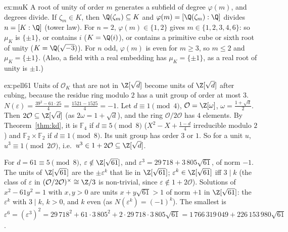 \begin{solution}{ex:muK}
\idea A root of unity of order $m$ generates a subfield of degree $\varphi(m)$, and degrees divide.
\writeup If $\zeta_m\in K$, then $\Q(\zeta_m)\subseteq K$ and $\varphi(m)=[\Q(\zeta_m):\Q]$ divides $n=[K:\Q]$ (tower law).
For $n=2$, $\varphi(m)\in\{1,2\}$ gives $m\in\{1,2,3,4,6\}$: so $\mu_K$ is $\{\pm1\}$, or contains $i$ ($K=\Q(i)$), or
contains a primitive cube or sixth root of unity ($K=\Q(\sqrt{-3})$). For $n$ odd, $\varphi(m)$ is even for $m\ge3$, so
$m\le2$ and $\mu_K=\{\pm1\}$. (Also, a field with a real embedding has $\mu_K=\{\pm1\}$, as a real root of unity is
$\pm1$.)
\end{solution}

\begin{solution}{ex:pell61}
\idea Units of $\mathcal O_K$ that are not in $\Z[\sqrt d]$ become units of $\Z[\sqrt d]$ after cubing, because the residue
ring modulo $2$ has a unit group of order at most $3$.
\writeup $N(\varepsilon)=\frac{39^2-61\cdot25}4=\frac{1521-1525}4=-1$. Let $d\equiv1\pmod4$, $\mathcal O=\Z[\omega]$,
$\omega=\frac{1+\sqrt d}2$. Then $2\mathcal O\subseteq\Z[\sqrt d]$ (as $2\omega=1+\sqrt d$), and the ring $\mathcal O/2\mathcal
O$ has $4$ elements. By Theorem~\ref{thm:kd}, it is $\mathbb F_4$ if $d\equiv5\pmod8$ ($X^2-X+\frac{1-d}4$ irreducible modulo
$2$) and $\mathbb F_2\times\mathbb F_2$ if $d\equiv1\pmod8$. Its unit group has order $3$ or $1$. So for a unit $u$, $u^3\equiv1
\pmod{2\mathcal O}$, i.e.\ $u^3\in1+2\mathcal O\subseteq\Z[\sqrt d]$.

For $d=61\equiv5\pmod8$, $\varepsilon\notin\Z[\sqrt{61}]$, and $\varepsilon^3=29\,718+3\,805\sqrt{61}$, of norm $-1$. The units
of $\Z[\sqrt{61}]$ are the $\pm\varepsilon^k$ that lie in $\Z[\sqrt{61}]$; $\varepsilon^k\in\Z[\sqrt{61}]$ iff $3\mid k$ (the class
of $\varepsilon$ in $(\mathcal O/2\mathcal O)^\times\cong\Z/3$ is non-trivial, since $\varepsilon\notin1+2\mathcal O$). Solutions of
$x^2-61y^2=1$ with $x,y>0$ are units $x+y\sqrt{61}>1$ of norm $+1$ in $\Z[\sqrt{61}]$: the $\varepsilon^{k}$ with $3\mid k$,
$k>0$, and $k$ even (as $N(\varepsilon^k)=(-1)^k$). The smallest is $\varepsilon^6=(\varepsilon^3)^2=29\,718^2+61\cdot3\,805^2+
2\cdot29\,718\cdot3\,805\sqrt{61}=1\,766\,319\,049+226\,153\,980\sqrt{61}$.
\end{solution}

